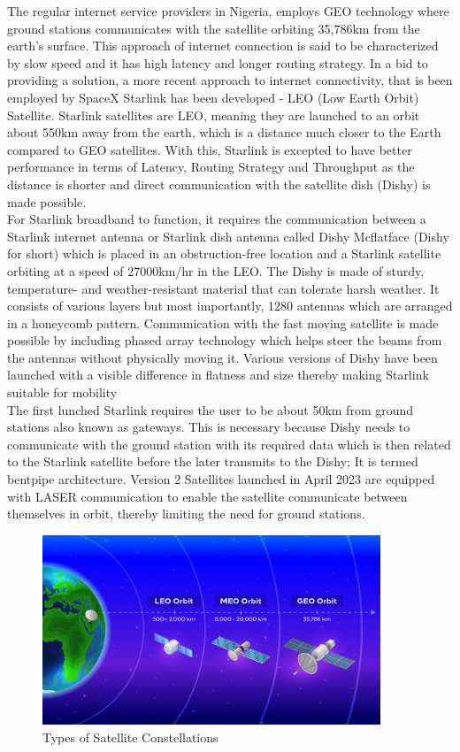 	The regular internet service providers in Nigeria, employs GEO technology where ground stations communicates with the satellite orbiting 35,786km from the earth's surface. This approach of internet connection is said to be characterized by slow speed and it has high latency and longer routing strategy.
	In a bid to providing a solution, a more recent approach to internet connectivity, that is been employed by SpaceX Starlink has been developed -  LEO (Low Earth Orbit) Satellite.
	Starlink satellites are LEO, meaning they are launched to an orbit about 550km away from the earth, which is a distance much closer to the Earth compared to GEO satellites. With this, Starlink is excepted to have better performance in terms of Latency, Routing Strategy and Throughput as the distance is shorter and direct communication with the satellite dish (Dishy) is made possible.\\
	For Starlink broadband to function, it requires the communication between a Starlink internet antenna or Starlink dish antenna called Dishy Mcflatface (Dishy for short) which is placed in an obstruction-free location and a Starlink satellite orbiting at a speed of 27000km/hr in the LEO.
	The Dishy is made of sturdy, temperature- and weather-resistant material that can tolerate harsh weather. It consists of various layers but most importantly, 1280 antennas which are arranged in a honeycomb pattern. Communication with the fast moving satellite is made possible by including phased array technology which helps steer the beams from the antennas without physically moving it. Various versions of Dishy have been launched with a visible difference in flatness and size thereby making Starlink suitable for mobility\\
	The first lunched Starlink requires the user to be about 50km from ground stations also known as gateways. This  is necessary because Dishy needs to communicate with the ground station with its required data which is then related to the Starlink satellite before the later transmits to the Dishy; It is termed bentpipe architecture. Version 2 Satellites launched in April 2023 are equipped with LASER communication to enable the satellite communicate between themselves in orbit, thereby limiting the need for ground stations.
	
\begin{figure}[H]
\centering
\includegraphics[width=0.9\textwidth]{space orbits}
\caption{Types of Satellite Constellations}
\end{figure}

